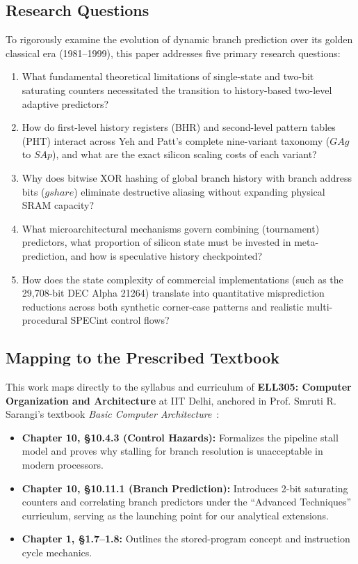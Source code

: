 \documentclass[11pt,a4paper]{article}
\begin{document}
\subsection{Research Questions}
\label{sec:rqs}
To rigorously examine the evolution of dynamic branch prediction over its golden classical era (1981--1999), this paper addresses five primary research questions:
\begin{enumerate}[label=\textbf{RQ\arabic*:}, leftmargin=3.2em, itemsep=0.4em]
    \item What fundamental theoretical limitations of single-state and two-bit saturating counters necessitated the transition to history-based two-level adaptive predictors?
    \item How do first-level history registers (BHR) and second-level pattern tables (PHT) interact across Yeh and Patt's complete nine-variant taxonomy ($GAg$ to $SAp$), and what are the exact silicon scaling costs of each variant?
    \item Why does bitwise XOR hashing of global branch history with branch address bits ($gshare$) eliminate destructive aliasing without expanding physical SRAM capacity?
    \item What microarchitectural mechanisms govern combining (tournament) predictors, what proportion of silicon state must be invested in meta-prediction, and how is speculative history checkpointed?
    \item How does the state complexity of commercial implementations (such as the 29,708-bit DEC Alpha 21264) translate into quantitative misprediction reductions across both synthetic corner-case patterns and realistic multi-procedural SPECint control flows?
\end{enumerate}

\subsection{Mapping to the Prescribed Textbook}
\label{sec:textbook_map}
This work maps directly to the syllabus and curriculum of \textbf{ELL305: Computer Organization and Architecture} at IIT Delhi, anchored in Prof. Smruti R. Sarangi's textbook \textit{Basic Computer Architecture}~\cite{sarangi2021}:
\begin{itemize}[leftmargin=1.5em, itemsep=0.3em]
    \item \textbf{Chapter 10, \S10.4.3 (Control Hazards):} Formalizes the pipeline stall model and proves why stalling for branch resolution is unacceptable in modern processors.
    \item \textbf{Chapter 10, \S10.11.1 (Branch Prediction):} Introduces 2-bit saturating counters and correlating branch predictors under the ``Advanced Techniques'' curriculum, serving as the launching point for our analytical extensions.
    \item \textbf{Chapter 1, \S1.7--1.8:} Outlines the stored-program concept and instruction cycle mechanics.
\end{itemize}
\end{document}
